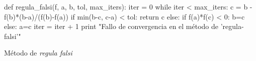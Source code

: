 \begin{algorithm}  \begin{python}
def regula_falsi(f, a, b, tol, max_iters):
    iter = 0
    while iter < max_iters:
        c = b - f(b)*(b-a)/(f(b)-f(a))
        if min(b-c, c-a) < tol:
            return c
        else:
            if f(a)*f(c) < 0:
                b=c
            else:
                a=c
        iter = iter + 1
    print "Fallo de convergencia en el método de 'regula-falsi'"
\end{python}
\caption{Método de \textit{regula falsi}}
\label{alg:metodo-regula-falsi}
\end{algorithm}


